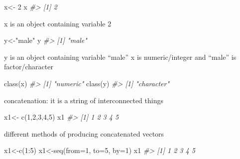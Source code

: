 \documentclass[
]{article}
\newenvironment{Shaded}{\begin{snugshade}}{\end{snugshade}}
\newcommand{\AttributeTok}[1]{\textcolor[rgb]{0.77,0.63,0.00}{#1}}
\newcommand{\CommentTok}[1]{\textcolor[rgb]{0.56,0.35,0.01}{\textit{#1}}}
\newcommand{\DecValTok}[1]{\textcolor[rgb]{0.00,0.00,0.81}{#1}}
\newcommand{\FunctionTok}[1]{\textcolor[rgb]{0.00,0.00,0.00}{#1}}
\newcommand{\NormalTok}[1]{#1}
\newcommand{\OtherTok}[1]{\textcolor[rgb]{0.56,0.35,0.01}{#1}}
\newcommand{\SpecialCharTok}[1]{\textcolor[rgb]{0.00,0.00,0.00}{#1}}
\newcommand{\StringTok}[1]{\textcolor[rgb]{0.31,0.60,0.02}{#1}}
\begin{document}
\begin{Shaded}
\begin{Highlighting}[]
\NormalTok{x}\OtherTok{\textless{}{-}} \DecValTok{2}
\NormalTok{x}
\CommentTok{\#\textgreater{} [1] 2}
\end{Highlighting}
\end{Shaded}

x is an object containing variable 2

\begin{Shaded}
\begin{Highlighting}[]
\NormalTok{y}\OtherTok{\textless{}{-}}\StringTok{"male"}
\NormalTok{y}
\CommentTok{\#\textgreater{} [1] "male"}
\end{Highlighting}
\end{Shaded}

y is an object containing variable ``male''
x is numeric/integer and ``male'' is factor/character

\begin{Shaded}
\begin{Highlighting}[]
\FunctionTok{class}\NormalTok{(x)}
\CommentTok{\#\textgreater{} [1] "numeric"}
\FunctionTok{class}\NormalTok{(y)}
\CommentTok{\#\textgreater{} [1] "character"}
\end{Highlighting}
\end{Shaded}

concatenation: it is a string of interconnected things

\begin{Shaded}
\begin{Highlighting}[]
\NormalTok{x1}\OtherTok{\textless{}{-}} \FunctionTok{c}\NormalTok{(}\DecValTok{1}\NormalTok{,}\DecValTok{2}\NormalTok{,}\DecValTok{3}\NormalTok{,}\DecValTok{4}\NormalTok{,}\DecValTok{5}\NormalTok{)}
\NormalTok{x1}
\CommentTok{\#\textgreater{} [1] 1 2 3 4 5}
\end{Highlighting}
\end{Shaded}

different methods of producing concatenated vectors

\begin{Shaded}
\begin{Highlighting}[]
\NormalTok{x1}\OtherTok{\textless{}{-}}\FunctionTok{c}\NormalTok{(}\DecValTok{1}\SpecialCharTok{:}\DecValTok{5}\NormalTok{)}
\NormalTok{x1}\OtherTok{\textless{}{-}}\FunctionTok{seq}\NormalTok{(}\AttributeTok{from=}\DecValTok{1}\NormalTok{, }\AttributeTok{to=}\DecValTok{5}\NormalTok{, }\AttributeTok{by=}\DecValTok{1}\NormalTok{)}
\NormalTok{x1}
\CommentTok{\#\textgreater{} [1] 1 2 3 4 5}
\end{Highlighting}
\end{Shaded}
\end{document}
